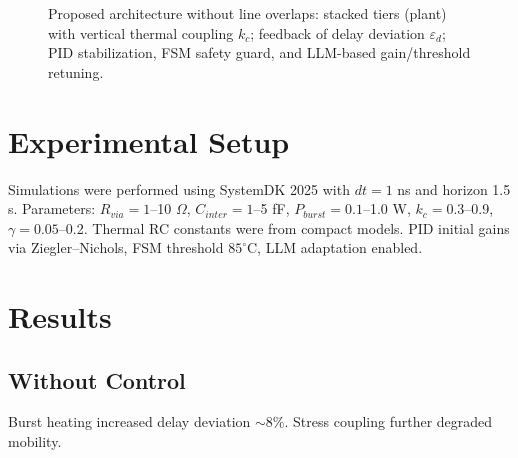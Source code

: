 \documentclass[conference]{IEEEtran}
\begin{document}
\begin{figure}[t]

\caption{Proposed architecture without line overlaps:
stacked tiers (plant) with vertical thermal coupling $k_c$; feedback of delay deviation $\varepsilon_d$;
PID stabilization, FSM safety guard, and LLM-based gain/threshold retuning.}
\label{fig:model_tikz}
\end{figure}

\section{Experimental Setup}
Simulations were performed using SystemDK 2025 with $dt=1$ ns and horizon 1.5 s. Parameters:  
$R_{via}=1$--10 $\Omega$, $C_{inter}=1$--5 fF, $P_{burst}=0.1$--1.0 W, $k_c=0.3$--0.9, $\gamma=0.05$--0.2.  
Thermal RC constants were from compact models. PID initial gains via Ziegler–Nichols, FSM threshold $85^\circ$C, LLM adaptation enabled.

\section{Results}
\subsection{Without Control}
Burst heating increased delay deviation $\sim$8\%. Stress coupling further degraded mobility.  
\end{document}
